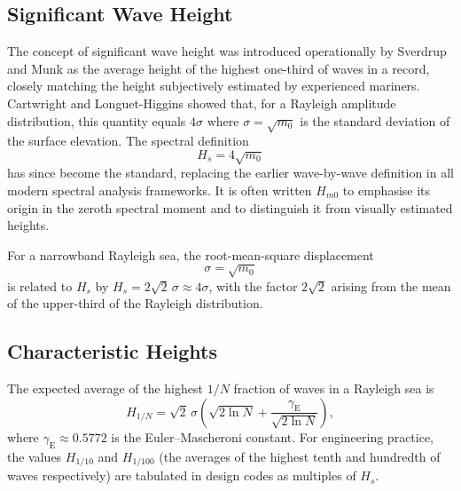 \documentclass[journal]{IEEEtran}
\begin{document}
    \subsection{Significant Wave Height}

    The concept of significant wave height was introduced operationally
    by Sverdrup and Munk \cite{Sverdrup1947} as the average height of
    the highest one-third of waves in a record, closely matching the
    height subjectively estimated by experienced mariners.
    Cartwright and Longuet-Higgins \cite{Cartwright1956} showed that, for
    a Rayleigh amplitude distribution, this quantity equals $4\sigma$ where
    $\sigma = \sqrt{m_0}$ is the standard deviation of the surface
    elevation.
    The spectral definition
    \begin{equation}
        H_s = 4\sqrt{m_0}
        \label{eq:Hs}
    \end{equation}
    has since become the standard, replacing the earlier wave-by-wave
    definition in all modern spectral analysis frameworks.
    It is often written $H_{m0}$ to emphasise its origin in the zeroth
    spectral moment and to distinguish it from visually estimated heights.

    For a narrowband Rayleigh sea, the root-mean-square displacement
    \begin{equation}
        \sigma = \sqrt{m_0}
    \end{equation}
    is related to $H_s$ by $H_s = 2\sqrt{2}\,\sigma \approx 4\sigma$,
    with the factor $2\sqrt{2}$ arising from the mean of the upper-third
    of the Rayleigh distribution.

    \subsection{Characteristic Heights}

    The expected average of the highest $1/N$ fraction of waves in a
    Rayleigh sea is \cite{Longuet1963}
    \begin{equation}
        H_{1/N} = \sqrt{2}\,\sigma\!\left(\sqrt{2\ln N}
        + \frac{\gamma_\mathrm{E}}{\sqrt{2\ln N}}\right),
    \end{equation}
    where $\gamma_\mathrm{E} \approx 0.5772$ is the Euler--Mascheroni
    constant.
    For engineering practice, the values $H_{1/10}$ and $H_{1/100}$
    (the averages of the highest tenth and hundredth of waves respectively)
    are tabulated in design codes as multiples of $H_s$.
\end{document}
